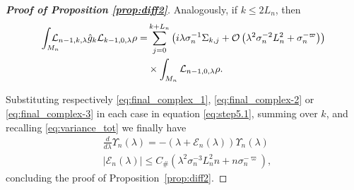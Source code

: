 \documentclass{amsart}
\numberwithin{equation}{section}
\newcommand\cE{{\mathcal E}}
\newcommand\cL{{\mathcal L}}
\newcommand\cO{{\mathcal O}}
\newcommand{\Const}{C_{\#}}
\begin{document}
\begin{proof}[\bf \em  Proof of Proposition \ref{prop:diff2}]
Analogously, if $k\leq 2 L_n$, then
\begin{equation}\label{eq:final_complex-3}
\begin{split}
\int_{M_n}\hskip-10pt \cL_{n-1,k,\lambda}\hat g_k\cL_{k-1,0,\lambda}\rho =&\sum_{j=0}^{k+L_n}\left(i\lambda\sigma_n^{-1}\Sigma_{k,j}+\cO\left(\lambda^2\sigma_n^{-2}L_n^2+\sigma_n^{-\varpi}\right)\right)\\
&\times \int_{M_n}\cL_{n-1,0,\lambda}\rho.
\end{split}
\end{equation}

Substituting respectively \eqref{eq:final_complex_1}, \eqref{eq:final_complex-2} or \eqref{eq:final_complex-3}
in each case in equation \eqref{eq:step5.1}, summing over $k$, and recalling \eqref{eq:variance_tot} we finally have
\[
\begin{split}
&\frac{d}{d\lambda}\Upsilon_n(\lambda)=- \left(\lambda+\cE_n(\lambda)\right)\Upsilon_n(\lambda) \\
&\left|\cE_n(\lambda)\right|\leq \Const \left(\lambda^2\sigma_n^{-3}L_n^2 n+ n  \sigma_n^{-\varpi}\right),
\end{split}
\]
concluding the proof of Proposition~\ref{prop:diff2}.
\end{proof}
\end{document}

